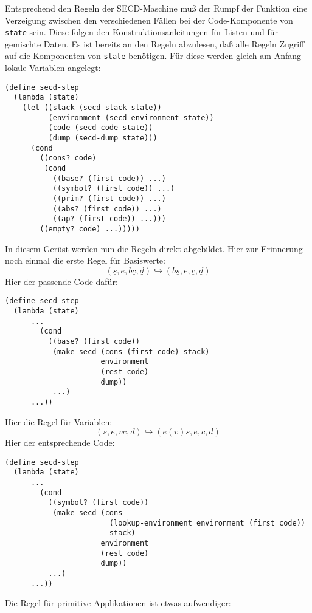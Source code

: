 %
Entsprechend den Regeln der SECD-Maschine muß der Rumpf der Funktion
eine Verzeigung zwischen den verschiedenen Fällen bei der
Code-Komponente von \texttt{state} sein.  Diese folgen den
Konstruktionsanleitungen für Listen und für gemischte Daten.  Es ist
bereits an den Regeln abzulesen, daß alle Regeln Zugriff auf die
Komponenten von \texttt{state} benötigen.  Für diese werden gleich am
Anfang lokale Variablen angelegt:
%
\begin{verbatim}
(define secd-step
  (lambda (state)
    (let ((stack (secd-stack state))
          (environment (secd-environment state))
          (code (secd-code state))
          (dump (secd-dump state)))
      (cond
        ((cons? code)
         (cond
           ((base? (first code)) ...)
           ((symbol? (first code)) ...)
           ((prim? (first code)) ...)
           ((abs? (first code)) ...)
           ((ap? (first code)) ...)))
        ((empty? code) ...)))))
\end{verbatim}
%
In diesem Gerüst werden nun die Regeln direkt abgebildet.  Hier zur
Erinnerung noch einmal die erste Regel für Basiswerte:
%
\begin{displaymath}
  (\underline{s}, e, b\underline{c}, \underline{d})
  \hookrightarrow
  (b\underline{s}, e, \underline{c}, \underline{d})
\end{displaymath}
%
Hier der passende Code dafür:
%
\begin{verbatim}
(define secd-step
  (lambda (state)
      ...
        (cond
          ((base? (first code))
           (make-secd (cons (first code) stack)
                      environment
                      (rest code)
                      dump))
           ...)
      ...))
\end{verbatim}
%
Hier die Regel für Variablen:
\begin{displaymath}
  (\underline{s}, e, v\underline{c}, \underline{d})
  \hookrightarrow
  (e(v)\underline{s}, e, \underline{c}, \underline{d})
\end{displaymath}
%
Hier der entsprechende Code:
%
\begin{verbatim}
(define secd-step
  (lambda (state)
      ...
        (cond
          ((symbol? (first code))
           (make-secd (cons
                        (lookup-environment environment (first code))
                        stack)
                      environment
                      (rest code)
                      dump))
          ...)
      ...))
\end{verbatim}
%
Die Regel für primitive Applikationen ist etwas aufwendiger:
